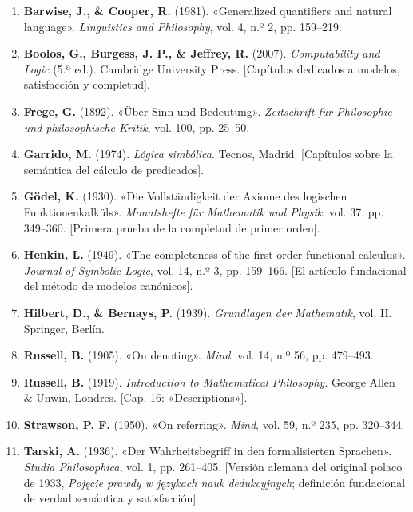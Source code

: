 \begin{enumerate}
    \item \textbf{Barwise, J., \& Cooper, R.} (1981). «Generalized quantifiers and natural language». \emph{Linguistics and Philosophy}, vol. 4, n.º 2, pp. 159--219.
    \item \textbf{Boolos, G., Burgess, J. P., \& Jeffrey, R.} (2007). \emph{Computability and Logic} (5.ª ed.). Cambridge University Press. [Capítulos dedicados a modelos, satisfacción y completud].
    \item \textbf{Frege, G.} (1892). «Über Sinn und Bedeutung». \emph{Zeitschrift für Philosophie und philosophische Kritik}, vol. 100, pp. 25--50.
    \item \textbf{Garrido, M.} (1974). \emph{Lógica simbólica}. Tecnos, Madrid. [Capítulos sobre la semántica del cálculo de predicados].
    \item \textbf{Gödel, K.} (1930). «Die Vollständigkeit der Axiome des logischen Funktionenkalküls». \emph{Monatshefte für Mathematik und Physik}, vol. 37, pp. 349--360. [Primera prueba de la completud de primer orden].
    \item \textbf{Henkin, L.} (1949). «The completeness of the first-order functional calculus». \emph{Journal of Symbolic Logic}, vol. 14, n.º 3, pp. 159--166. [El artículo fundacional del método de modelos canónicos].
    \item \textbf{Hilbert, D., \& Bernays, P.} (1939). \emph{Grundlagen der Mathematik}, vol. II. Springer, Berlín.
    \item \textbf{Russell, B.} (1905). «On denoting». \emph{Mind}, vol. 14, n.º 56, pp. 479--493.
    \item \textbf{Russell, B.} (1919). \emph{Introduction to Mathematical Philosophy}. George Allen \& Unwin, Londres. [Cap. 16: «Descriptions»].
    \item \textbf{Strawson, P. F.} (1950). «On referring». \emph{Mind}, vol. 59, n.º 235, pp. 320--344.
    \item \textbf{Tarski, A.} (1936). «Der Wahrheitsbegriff in den formalisierten Sprachen». \emph{Studia Philosophica}, vol. 1, pp. 261--405. [Versión alemana del original polaco de 1933, \emph{Pojęcie prawdy w językach nauk dedukcyjnych}; definición fundacional de verdad semántica y satisfacción].
\end{enumerate}

